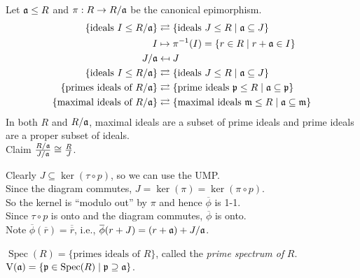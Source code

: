 \begin{fact}
    Let $\mathfrak{a} \leq R$ and $\pi: R \to R/\mathfrak{a}$ be the canonical epimorphism. 
    \begin{align*}
        \{\text{ideals }I \leq R/\mathfrak{a}\} &\rightleftarrows \{\text{ideals }J \leq R \mid \mathfrak{a} \subseteq J\} \\
        I &\mapsto \pi^{-1}(I) = \{r \in R \mid r + \mathfrak{a} \in I\} \\
        J/\mathfrak{a} &\mapsfrom J \\
    \{\text{ideals } I \leq R/\mathfrak{a}\} &\rightleftarrows \{\text{ideals }J \leq R \mid \mathfrak{a} \subseteq J\} \\
        \{\text{primes ideals of } R/\mathfrak{a}\} &\rightleftarrows \{\text{prime ideals }\mathfrak{p} \leq R \mid \mathfrak{a} \subseteq \mathfrak{p}\} \\
        \{\text{maximal ideals of } R/\mathfrak{a}\} &\rightleftarrows \{\text{maximal ideals }\mathfrak{m} \leq R \mid \mathfrak{a} \subseteq \mathfrak{m}\}
    \end{align*}
    In both $R$ and $R/\mathfrak{a}$, maximal ideals are a subset of prime ideals and prime ideals are a proper subset of ideals. \\
    Claim $\frac{R/\mathfrak{a}}{J/\mathfrak{a}} \cong \frac{R}{J}$.
    \begin{center}
    \end{center}
    Clearly $J \subseteq \ker(\tau \circ p)$, so we can use the UMP. \\
    Since the diagram commutes, $J = \ker(\pi) = \ker(\pi \circ p)$. \\
    So the kernel is ``modulo out'' by $\pi$ and hence $\overbar \phi$ is 1-1. \\
    Since $\tau \circ p$ is onto and the diagram commutes, $\overbar \phi$ is onto. \\
    Note $\overbar \phi(\overbar r) = \overbar {\overbar r}$, i.e., $\overbar \phi(r + J) = (r+\ffa) + J/\ffa$.

\end{fact}

\begin{notation*}
    $\operatorname{Spec}(R) = \{\text{primes ideals of $R$}\}$, called the \emph{prime spectrum of} $R$. \\
    $\operatorname{V}(\mathfrak{a}) = \{\mathfrak{p} \in \operatorname{Spec}(R) \mid \mathfrak{p} \supseteq \mathfrak{a}\}$.
\end{notation*}

